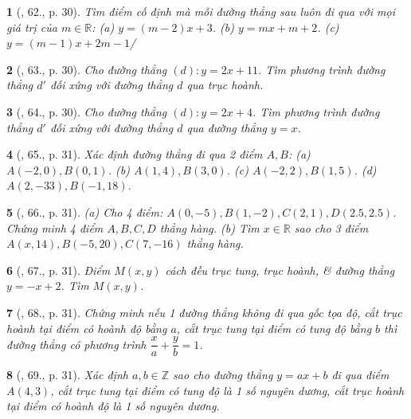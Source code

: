 \documentclass{article}
\newtheorem{baitoan}{}
\begin{document}
\begin{baitoan}[\cite{Binh_Toan_9_tap_1}, 62., p. 30]
	Tìm điểm cố định mà mỗi đường thẳng sau luôn đi qua với mọi giá trị của $m\in\mathbb{R}$: (a) $y = (m - 2)x + 3$. (b) $y = mx + m + 2$. (c) $y = (m - 1)x + 2m - 1$/
\end{baitoan}

\begin{baitoan}[\cite{Binh_Toan_9_tap_1}, 63., p. 30]
	Cho đường thẳng $(d):y = 2x + 11$. Tìm phương trình đường thẳng $d'$ đối xứng với đường thẳng $d$ qua trục hoành.
\end{baitoan}

\begin{baitoan}[\cite{Binh_Toan_9_tap_1}, 64., p. 30]
	Cho đường thẳng $(d):y = 2x + 4$. Tìm phương trình đường thẳng $d'$ đối xứng với đường thẳng $d$ qua đường thẳng $y = x$.
\end{baitoan}

\begin{baitoan}[\cite{Binh_Toan_9_tap_1}, 65., p. 31]
	Xác định đường thẳng đi qua 2 điểm $A,B$: (a) $A(-2,0),B(0,1)$. (b) $A(1,4),B(3,0)$. (c) $A(-2,2),B(1,5)$. (d) $A(2,-33),B(-1,18)$.
\end{baitoan}

\begin{baitoan}[\cite{Binh_Toan_9_tap_1}, 66., p. 31]
	(a) Cho 4 điểm: $A(0,-5),B(1,-2),C(2,1),D(2.5,2.5)$. Chứng minh 4 điểm $A,B,C,D$ thẳng hàng. (b) Tìm $x\in\mathbb{R}$ sao cho 3 điểm $A(x,14),B(-5,20),C(7,-16)$ thẳng hàng.
\end{baitoan}

\begin{baitoan}[\cite{Binh_Toan_9_tap_1}, 67., p. 31]
	Điểm $M(x,y)$ cách đều trục tung, trục hoành, \& đường thẳng $y = -x + 2$. Tìm $M(x,y)$.
\end{baitoan}

\begin{baitoan}[\cite{Binh_Toan_9_tap_1}, 68., p. 31]
	Chứng minh nếu 1 đường thẳng không đi qua gốc tọa độ, cắt trục hoành tại điểm có hoành độ bằng $a$, cắt trục tung tại điểm có tung độ bằng $b$ thì đường thẳng có phương trình $\dfrac{x}{a} + \dfrac{y}{b} = 1$.
\end{baitoan}

\begin{baitoan}[\cite{Binh_Toan_9_tap_1}, 69., p. 31]
	Xác định $a,b\in\mathbb{Z}$ sao cho đường thẳng $y = ax + b$ đi qua điểm $A(4,3)$, cắt trục tung tại điểm có tung độ là 1 số nguyên dương, cắt trục hoành tại điểm có hoành độ là 1 số nguyên dương.
\end{baitoan}
\end{document}
